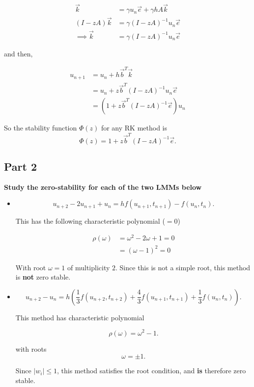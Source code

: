 \documentclass{article}
\begin{document}
\begin{itemize}
    \begin{align*}
      \vec{k} &= \gamma u_{n}\vec{e}+ \gamma hA\vec{k} \\
      (I-zA)\vec{k} & = \gamma (I-zA)^{-1}u_{n}\vec{e} \\
      \implies \vec{k} &= \gamma (I-zA)^{-1} u_{n} \vec{e}
    \end{align*}

    \par and then,

    \begin{align*}
      u_{n+1} &= u_{n} + h\vec{b}^T\vec{k} \\
             &= u_{n} + z \vec{b}^{T} (I-zA)^{-1} u_{n} \vec{e} \\
             &= \left(1 +z \vec{b}^{T} (I-zA)^{-1}  \vec{e} \right) u_{n}
    \end{align*}

    \par So the stability function $\Phi (z)$ for any RK method is
    \[
    \boxed{\Phi (z) = 1 +z \vec{b}^{T} (I-zA)^{-1}  \vec{e}}
    .\] 

\end{itemize}

\subsection{Part 2}%
\label{sub:part_2}

\par \textbf{Study the zero-stability for each of the two LMMs below}

\begin{itemize}
  \item \[
      u_{n+2}-2u_{n+1} + u_{n} = hf(u_{n+1},t_{n+1}) - f(u_{n},t_{n})
  .\] 

  \par This has the following characteristic polynomial ($=0$)

  \begin{align*}
    \rho (\omega) &= \omega^{2} -2 \omega + 1 = 0 \\
                  &= ( \omega - 1)^{2} = 0
  \end{align*}

  With root $ \omega = 1$ of multiplicity $2$. Since this is not a simple root,
  this method is \textbf{not} zero stable.

\item \[
    u_{n+2} - u_{n} = h \left( \frac{1}{3} f(u_{n+2}, t_{n+2}) + \frac{4}{3}
    f(u_{n+1},t_{n+1}) + \frac{1}{3}f(u_n,t_n)\right)
.\] 

\par This method has characteristic polynomial 

\[
  \rho ( \omega) = \omega^{2} -1
.\] 

with roots 
\[
\omega = \pm 1
.\] 

Since $|w_i|\leq 1$, this method satisfies the root condition, and \textbf{is} therefore
zero stable.

\end{itemize}
\end{document}
